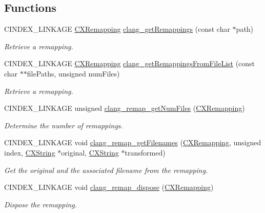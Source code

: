 \subsection*{Functions}
\begin{DoxyCompactItemize}
\item 
C\+I\+N\+D\+E\+X\+\_\+\+L\+I\+N\+K\+A\+GE \hyperlink{group__CINDEX__REMAPPING_ga04be0aca9e36a130cf1dd6fd8cbd4408}{C\+X\+Remapping} \hyperlink{group__CINDEX__REMAPPING_ga6388687c77b68fb0e83a393a91625c7f}{clang\+\_\+get\+Remappings} (const char $\ast$path)
\begin{DoxyCompactList}\small\item\em Retrieve a remapping. \end{DoxyCompactList}\item 
C\+I\+N\+D\+E\+X\+\_\+\+L\+I\+N\+K\+A\+GE \hyperlink{group__CINDEX__REMAPPING_ga04be0aca9e36a130cf1dd6fd8cbd4408}{C\+X\+Remapping} \hyperlink{group__CINDEX__REMAPPING_gadc19460a19f4f0d3ab8b722dca75b047}{clang\+\_\+get\+Remappings\+From\+File\+List} (const char $\ast$$\ast$file\+Paths, unsigned num\+Files)
\begin{DoxyCompactList}\small\item\em Retrieve a remapping. \end{DoxyCompactList}\item 
\mbox{\label{group__CINDEX__REMAPPING_ga17c7dd265fa861d2f7e67223eaae653d}} 
C\+I\+N\+D\+E\+X\+\_\+\+L\+I\+N\+K\+A\+GE unsigned \hyperlink{group__CINDEX__REMAPPING_ga17c7dd265fa861d2f7e67223eaae653d}{clang\+\_\+remap\+\_\+get\+Num\+Files} (\hyperlink{group__CINDEX__REMAPPING_ga04be0aca9e36a130cf1dd6fd8cbd4408}{C\+X\+Remapping})
\begin{DoxyCompactList}\small\item\em Determine the number of remappings. \end{DoxyCompactList}\item 
C\+I\+N\+D\+E\+X\+\_\+\+L\+I\+N\+K\+A\+GE void \hyperlink{group__CINDEX__REMAPPING_ga22fa206f0879f988bac281390063a9d7}{clang\+\_\+remap\+\_\+get\+Filenames} (\hyperlink{group__CINDEX__REMAPPING_ga04be0aca9e36a130cf1dd6fd8cbd4408}{C\+X\+Remapping}, unsigned index, \hyperlink{structCXString}{C\+X\+String} $\ast$original, \hyperlink{structCXString}{C\+X\+String} $\ast$transformed)
\begin{DoxyCompactList}\small\item\em Get the original and the associated filename from the remapping. \end{DoxyCompactList}\item 
\mbox{\label{group__CINDEX__REMAPPING_gafbd34560f59e5d3e0f5e746215b12ed7}} 
C\+I\+N\+D\+E\+X\+\_\+\+L\+I\+N\+K\+A\+GE void \hyperlink{group__CINDEX__REMAPPING_gafbd34560f59e5d3e0f5e746215b12ed7}{clang\+\_\+remap\+\_\+dispose} (\hyperlink{group__CINDEX__REMAPPING_ga04be0aca9e36a130cf1dd6fd8cbd4408}{C\+X\+Remapping})
\begin{DoxyCompactList}\small\item\em Dispose the remapping. \end{DoxyCompactList}\end{DoxyCompactItemize}


